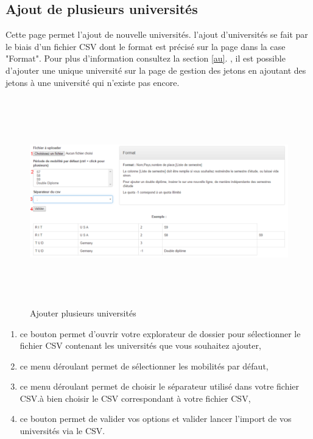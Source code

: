   \subsection{Ajout de plusieurs universités}
  Cette page permet l'ajout de nouvelle universités. l'ajout d'universités se fait par le biais d'un fichier CSV dont le format est précisé sur la page dans la case "Format". Pour plus d'information consultez la section \ref{au}. \att, il est possible d'ajouter une unique université sur la page de gestion des jetons en ajoutant des jetons à une université qui n'existe pas encore.
  \begin{figure}[H]
  	\centering
  	\includegraphics[width=16cm,height=9cm]{Images/Admin/ajout_plusieux_univ_admin.png}
  	\caption{Ajouter plusieurs universités}
  	
  \end{figure}
  \begin{enumerate}
  	\item ce bouton permet d'ouvrir votre explorateur de dossier pour sélectionner le fichier CSV contenant les universités que vous souhaitez ajouter,
  	\item ce menu déroulant permet de sélectionner les mobilités par défaut,
  	\item ce menu déroulant permet de choisir le séparateur utilisé dans votre fichier CSV.\att à bien choisir le CSV correspondant à votre fichier CSV,
  	\item ce bouton permet de valider vos options et valider lancer l'import de vos universités via le CSV.
  \end{enumerate}
  
